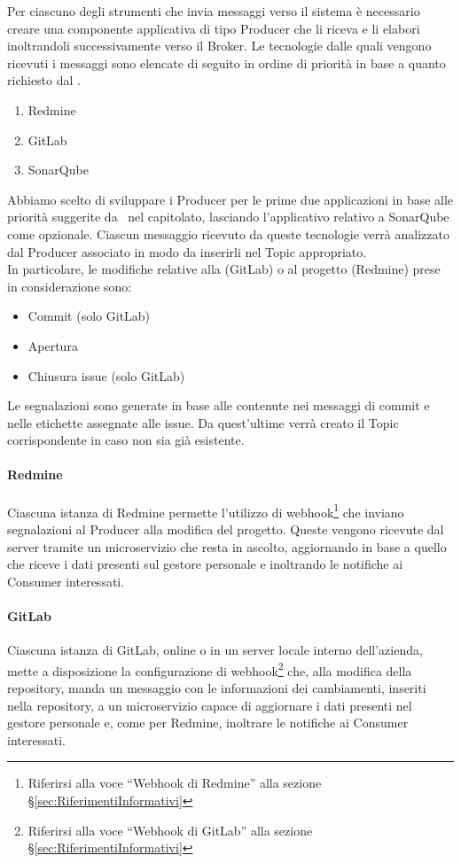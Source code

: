 		Per ciascuno degli strumenti che invia messaggi verso il sistema è necessario creare una componente applicativa di tipo Producer che li riceva e li elabori inoltrandoli successivamente verso il Broker.
		Le tecnologie dalle quali vengono ricevuti i messaggi sono elencate di seguito in ordine di priorità in base a quanto richiesto dal .
		\begin{enumerate}
			\item Redmine
			\item GitLab
			\item SonarQube
		\end{enumerate}
		Abbiamo scelto di sviluppare i Producer per le prime due applicazioni in base alle priorità suggerite da \II\ nel capitolato, lasciando l'applicativo relativo a SonarQube come opzionale.
		Ciascun messaggio ricevuto da queste tecnologie verrà analizzato dal Producer associato in modo da inserirli nel Topic appropriato.\\
		In particolare, le modifiche relative alla  (GitLab) o al progetto (Redmine) prese in considerazione sono:
		\begin{itemize}
			\item Commit (solo GitLab)
			\item Apertura  
			\item Chiusura issue (solo GitLab)
		\end{itemize}
		Le segnalazioni sono generate in base alle  contenute nei messaggi di commit e nelle etichette assegnate alle issue.
		Da quest'ultime verrà creato il Topic corrispondente in caso non sia già esistente.
		
		\paragraph{Redmine}
		Ciascuna istanza di Redmine permette l'utilizzo di webhook\footnote{Riferirsi alla voce ``Webhook di Redmine'' alla sezione \S\ref{sec:RiferimentiInformativi}} che inviano segnalazioni al Producer alla modifica del progetto.
		Queste vengono ricevute dal server tramite un microservizio che resta in ascolto, aggiornando in base a quello che riceve i dati presenti sul gestore personale e inoltrando le notifiche ai Consumer interessati.
		
		\paragraph{GitLab}
		Ciascuna istanza di GitLab, online o in un server locale interno dell'azienda, mette a disposizione la configurazione di webhook\footnote{Riferirsi alla voce ``Webhook di GitLab'' alla sezione \S\ref{sec:RiferimentiInformativi}} che, alla modifica della repository, manda un messaggio con le informazioni dei cambiamenti, inseriti nella repository, a un microservizio capace di aggiornare i dati presenti nel gestore personale e, come per Redmine, inoltrare le notifiche ai Consumer interessati.
		
